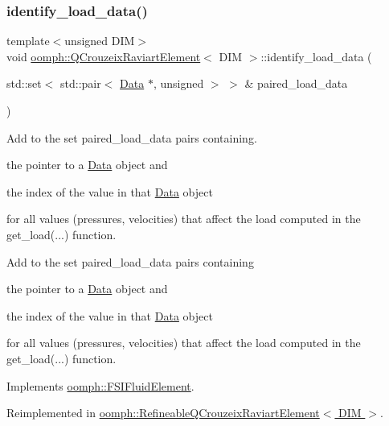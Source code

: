 \subsubsection{\texorpdfstring{identify\+\_\+load\+\_\+data()}{identify\_load\_data()}}
{\footnotesize\ttfamily template$<$unsigned D\+IM$>$ \\
void \hyperlink{classoomph_1_1QCrouzeixRaviartElement}{oomph\+::\+Q\+Crouzeix\+Raviart\+Element}$<$ D\+IM $>$\+::identify\+\_\+load\+\_\+data (\begin{DoxyParamCaption}\item[{std\+::set$<$ std\+::pair$<$ \hyperlink{classoomph_1_1Data}{Data} $\ast$, unsigned $>$ $>$ \&}]{paired\+\_\+load\+\_\+data }\end{DoxyParamCaption})\hspace{0.3cm}{\ttfamily [virtual]}}



Add to the set {\ttfamily paired\+\_\+load\+\_\+data} pairs containing. 


\begin{DoxyItemize}
\item the pointer to a \hyperlink{classoomph_1_1Data}{Data} object and
\item the index of the value in that \hyperlink{classoomph_1_1Data}{Data} object
\end{DoxyItemize}for all values (pressures, velocities) that affect the load computed in the {\ttfamily get\+\_\+load}(...) function.

Add to the set {\ttfamily paired\+\_\+load\+\_\+data} pairs containing
\begin{DoxyItemize}
\item the pointer to a \hyperlink{classoomph_1_1Data}{Data} object and
\item the index of the value in that \hyperlink{classoomph_1_1Data}{Data} object
\end{DoxyItemize}for all values (pressures, velocities) that affect the load computed in the {\ttfamily get\+\_\+load}(...) function. 

Implements \hyperlink{classoomph_1_1FSIFluidElement_a13c5f835cddd1b78e6d2582733619300}{oomph\+::\+F\+S\+I\+Fluid\+Element}.



Reimplemented in \hyperlink{classoomph_1_1RefineableQCrouzeixRaviartElement_ad2389a0bad47e50cb11cb2cea3f57b24}{oomph\+::\+Refineable\+Q\+Crouzeix\+Raviart\+Element$<$ D\+I\+M $>$}.



